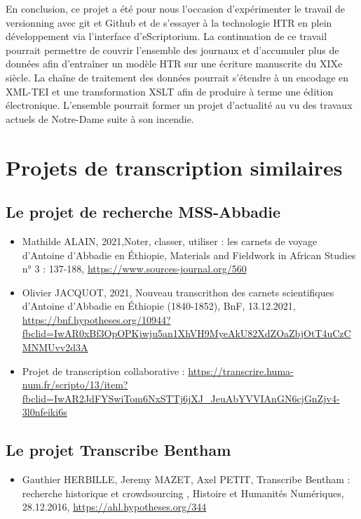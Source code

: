 \documentclass{article}
\begin{document}
En conclusion, ce projet a été pour nous l’occasion d’expérimenter le travail de versionning avec git et Github et de s’essayer à la technologie HTR en plein développement via l’interface d’eScriptorium. La continuation de ce travail pourrait permettre de couvrir l’ensemble des journaux et d’accumuler plus de données afin d’entraîner un modèle HTR sur une écriture manuscrite du XIXe siècle. La chaîne de traitement des données pourrait s’étendre à un encodage en XML-TEI et une transformation XSLT afin de produire à terme une édition électronique. L’ensemble pourrait former un projet d’actualité au vu des travaux actuels de Notre-Dame suite à son incendie.




\section*{Projets de transcription similaires}


\subsection*{Le projet de recherche MSS-Abbadie}

\begin{itemize}
\item Mathilde ALAIN, 2021,\og Noter, classer, utiliser : les carnets de voyage d’Antoine d’Abbadie en Éthiopie\fg, Materials and Fieldwork in African Studies n° 3 : 137-188, 
\url{https://www.sources-journal.org/560}

\item Olivier JACQUOT, 2021, \og Nouveau transcrithon des carnets scientifiques d’Antoine d’Abbadie en Éthiopie (1840-1852)\fg, BnF, 13.12.2021, \url{https://bnf.hypotheses.org/10944?fbclid=IwAR0xBf3OpOPKjwju5an1XhVH9MyeAkU82XdZOaZbjOtT4uCzCMNMUvv2d3A}

\item Projet de transcription collaborative : \url{https://transcrire.huma-num.fr/scripto/13/item?fbclid=IwAR2JdFYSwiTom6NxSTTj6jXJ_JeuAbYVVIAnGN6cjGnZjv4-3l0nfeiki6s}


\end{itemize}




\subsection*{Le projet Transcribe Bentham}

\begin{itemize}
\item Gauthier HERBILLE, Jeremy MAZET, Axel PETIT, \og Transcribe Bentham : recherche historique et crowdsourcing \fg,  Histoire et Humanités Numériques, 28.12.2016, \url{https://ahl.hypotheses.org/344}




\end{itemize}
\end{document}
